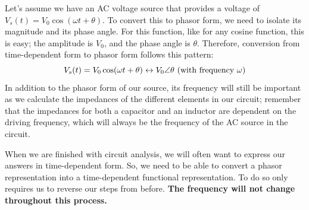 \par
Let's assume we have an AC voltage source that provides a voltage of $V_s(t) = V_0\cos(\omega t + \theta)$. To convert this to phasor form, we need to isolate its magnitude and its phase angle. For this function, like for any cosine function, this is easy; the amplitude is $V_0$, and the phase angle is $\theta$. Therefore, conversion from time-dependent form to phasor form follows this pattern:
$$
V_s(t) = V_0\cos(\omega t + \theta) \leftrightarrow V_0\angle\theta \textnormal{ (with frequency }\omega\textnormal{)}
$$
In addition to the phasor form of our source, its frequency will still be important as we calculate the impedances of the different elements in our circuit; remember that the impedances for both a capacitor and an inductor are dependent on the driving frequency, which will always be the frequency of the AC source in the circuit. 
\par
When we are finished with circuit analysis, we will often want to express our answers in time-dependent form. So, we need to be able to convert a phasor representation into a time-dependent functional representation. To do so only requires us to reverse our steps from before. \textbf{The frequency will not change throughout this process.} 
